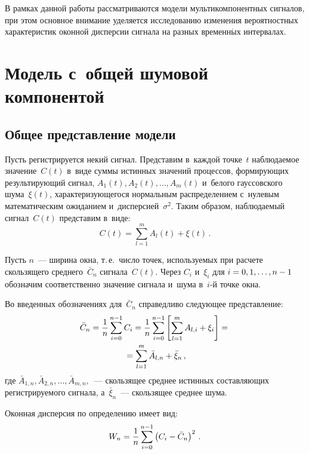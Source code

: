 \begin{multicols}{2}
В рамках данной работы рассматриваются модели мультикомпонентных сигналов, 
при этом основное внимание уделяется исследованию изменения вероятностных 
характеристик оконной дисперсии сигнала на разных временн$\acute{\mbox{ы}}$х интервалах.

\section{Модель с~общей шумовой компонентой}

\subsection{Общее представление модели}

Пусть регистрируется некий сигнал. Представим в~каждой точке~$t$ 
наблюдаемое значение~$C(t)$ в~виде суммы истинных значений процессов,
 формирующих результирующий сигнал, $A_{1}(t), A_{2}(t), \ldots, A_{m}(t)$ и~белого 
 гауссовского шума~$\xi(t)$,
характеризующегося нормальным распределением с~нулевым математическим 
ожиданием и~дисперсией~$\sigma^{2}$. Таким образом, наблюдаемый сигнал~$C(t)$ 
представим в~виде:
\begin{equation}
\label{1}
C(t) = \sum\limits_{l=1}^{m}A_{l}(t) + \xi(t)\,.
\end{equation}

Пусть $n$~--- ширина окна, т.\,е.\ число точек, используемых при расчете 
скользящего среднего~$\bar{C}_n$ сигнала~$C(t)$.
Через $C_{i}$ и~$\xi_{i}$ для $i\hm=0,1,\ldots,n-1$ обозначим соответственно 
значение сигнала и~шума в~$i$-й точке окна.

Во введенных  обозначениях для~$\bar{C}_n$ справедливо следующее представление:
\begin{multline}
\label{2}
\bar{C}_n= \displaystyle\frac{\displaystyle 1\mathstrut}{\displaystyle n\mathstrut}\sum\limits_{i=0}^{n-1}C_{i} = \displaystyle\frac{\displaystyle 1\mathstrut}{\displaystyle n\mathstrut}
\sum\limits_{i=0}^{n-1}\left[ \sum\limits_{l=1}^{m}A_{l,i} +
 \xi_{i} \right] = {}\\
 {}=\sum\limits_{l=1}^{m}\bar{A}_{l,n} + \bar{\xi}_{n}  \,,
\end{multline}
где $\bar{A}_{1,n}, \bar{A}_{2,n}, \ldots, \bar{A}_{m,n},$~--- 
скользящее среднее истинных составляющих регистрируемого сигнала, а~$\bar{\xi}_{n}$~--- 
скользящее среднее шума.

Оконная дисперсия по определению имеет вид:
\begin{equation}
\label{3}
W_n= \displaystyle\frac{\displaystyle 1\mathstrut}{\displaystyle n\mathstrut}\sum\limits_{i=0}^{n-1}\left( C_{i} -\bar{C}_n \right)^2 \,.
\end{equation}


\end{multicols}
